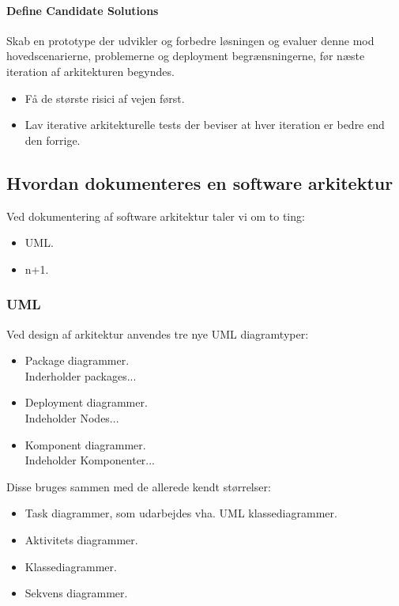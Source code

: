 \paragraph{Define Candidate Solutions}
Skab en prototype der udvikler og forbedre løsningen og evaluer denne mod hovedscenarierne, problemerne og deployment begrænsningerne, før næste iteration af arkitekturen begyndes.

\begin{itemize}
	\item Få de største risici af vejen først.
	\item Lav iterative arkitekturelle tests der beviser at hver iteration er bedre end den forrige.
\end{itemize}

\subsection{Hvordan dokumenteres en software arkitektur}
Ved dokumentering af software arkitektur taler vi om to ting:
\begin{itemize}
	\item UML.
	\item n+1.
\end{itemize}

\subsubsection{UML}
Ved design af arkitektur anvendes tre nye UML diagramtyper:

\begin{itemize}
	\item Package diagrammer.\\
	Inderholder packages...
	\item Deployment diagrammer.\\
	Indeholder Nodes...
	\item Komponent diagrammer.\\
	Indeholder Komponenter...
\end{itemize}

Disse bruges sammen med de allerede kendt størrelser:

\begin{itemize}
	\item Task diagrammer, som udarbejdes vha. UML klassediagrammer.
	\item Aktivitets diagrammer.
	\item Klassediagrammer.
	\item Sekvens diagrammer.
\end{itemize}

